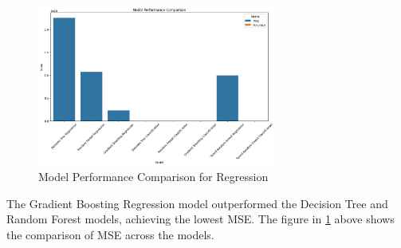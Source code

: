 \begin{figure}[H]
    \centering
    \includegraphics[width=0.7\textwidth]{assets/images/regression_performance.png}
    \caption{Model Performance Comparison for Regression}
    \label{fig:regression_performance}
\end{figure}

The Gradient Boosting Regression model outperformed the Decision Tree and Random Forest models, achieving the lowest MSE. The figure in \ref{fig:regression_performance} above shows the comparison of MSE across the models.


